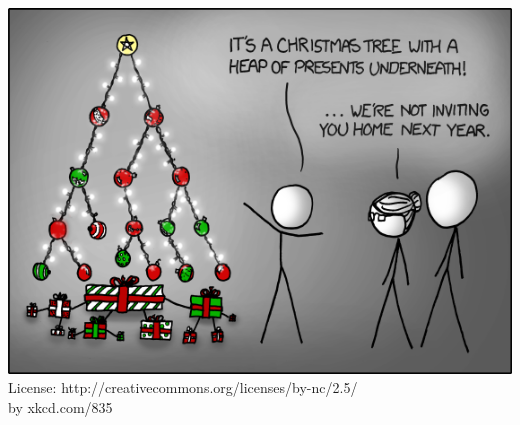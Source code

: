 \documentclass[18pt]{beamer}
\begin{document}
\begin{frame}
\includegraphics[scale=0.5]{tree} \\
License: http://creativecommons.org/licenses/by-nc/2.5/ \\
by xkcd.com/835
\end{frame}
\end{document}
